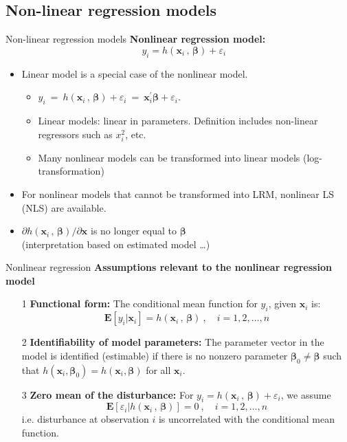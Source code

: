 \documentclass{beamer}
\begin{document}
\subsection{Non-linear regression models}
\begin{frame}{Non-linear regression models}
\textbf{Nonlinear regression model:}
$$
~~~~~y_i = h(\bm{x}_i\, , \,\bm{\beta}) + \varepsilon_i
$$
\begin{itemize}
    \item Linear model is a special case of the nonlinear model.
    \begin{itemize}
        \smallskip
        \item $y_i ~=~ h(\bm{x}_i\, , \,\bm{\beta}) + \varepsilon_i ~=~ \bm{x}_i^{\prime}\bm{\beta} + \varepsilon_i$.
        \smallskip
        \item Linear models: linear in parameters. Definition includes non-linear regressors such as $x_i^2$, etc.
        \smallskip
        \item Many nonlinear models can be transformed into linear models (log-transformation)
    \end{itemize}
    \medskip
    \item For nonlinear models that cannot be transformed into LRM, nonlinear LS (NLS) are available.
    \medskip
    \item $\partial h(\bm{x}_i\, , \,\bm{\beta})/\partial \bm{x}$ is no longer equal to $\bm\beta$ \\
    (interpretation based on estimated model \dots)
\end{itemize}
\end{frame}
\begin{frame}{Nonlinear regression}
\textbf{Assumptions relevant to the nonlinear regression model}\\
\begin{itemize}
 \item[1] \textbf{Functional form:} The conditional mean function for $y_i$, given $\bm{x}_i$ is: $$\mathbf{E}[y_i|\bm{x}_i] = h(\bm{x}_i\, , \,\bm{\beta})~, \quad i=1,2,\dots,n$$
 \item[2] \textbf{Identifiability of model parameters:} The parameter vector in the model is identified (estimable) if there is no nonzero parameter $\bm{\beta}_0 \neq \bm{\beta}$ such that $h(\bm{x}_i, \bm{\beta}_0)=h(\bm{x}_i, \bm{\beta})$ for all $\bm{x}_i$.
 \medskip
 \item[3] \textbf{Zero mean of the disturbance:} For $y_i = h(\bm{x}_i\, , \,\bm{\beta}) + \varepsilon_i$, we assume $$
 \mathbf{E}[\varepsilon_i| h(\bm{x}_i\, , \,\bm{\beta})] = 0~, \quad i=1,2,\dots,n
 $$
 i.e. disturbance at observation $i$ is uncorrelated with the conditional mean function.
\end{itemize}
\end{frame}
\end{document}
